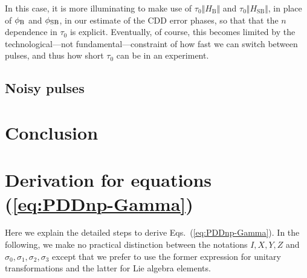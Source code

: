\documentclass[pra,reprint,superscriptaddress]{revtex4-2}
\newcommand{\HB}{H_\mathrm{B}}
\newcommand{\HSB}{H_\mathrm{SB}}
\begin{document}
In this case, it is more illuminating to make use of $\tau_0\Vert \HB\Vert$ and $\tau_0\Vert\HSB\Vert$, in place of $\phi_{\mathrm{B}}$ and $\phi_{\mathrm{SB}}$, in our estimate of the CDD error phases, so that that the $n$ dependence in $\tau_0$ is explicit. 
Eventually, of course, this becomes limited by the technological---not fundamental---constraint of how fast we can switch between pulses, and thus how short $\tau_0$ can be in an experiment.


\subsection{Noisy pulses}




\section{Conclusion}




\acknowledgments
{}


\newpage
\appendix
\section{Derivation for equations (\ref{eq:PDDnp-Gamma})}\label{app:PDDnpDerivation}
Here we explain the detailed steps to derive Eqs.~\!(\ref{eq:PDDnp-Gamma}).
In the following, we make no practical distinction between the notations $I,X,Y,Z$ and $\sigma_0,\sigma_1,\sigma_2,\sigma_3$ except that we prefer to use the former 
expression for unitary transformations and the latter for Lie algebra elements.
\end{document}
